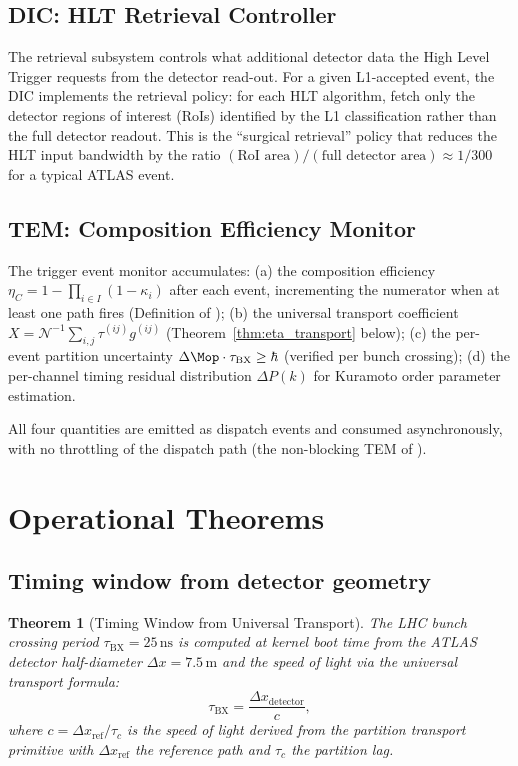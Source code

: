 \documentclass[twocolumn,10pt,a4paper]{article}
\theoremstyle{thmstyle}
\newtheorem{theorem}{Theorem}[section]
\theoremstyle{definition}
\theoremstyle{remark}
\newcommand{\tBX}{\tau_{\mathrm{BX}}}
\newcommand{\DeltaP}{\Delta P}
\newcommand{\etaC}{\eta_{C}}
\newcommand{\TP}{X}
\newcommand{\lag}{\tau}
\newcommand{\cpl}{g}
\newcommand{\catpow}{\kappa}
\begin{document}
\subsection{DIC: HLT Retrieval Controller}

The retrieval subsystem controls what additional detector data the High Level
Trigger requests from the detector read-out. For a given L1-accepted event,
the DIC implements the retrieval policy:
for each HLT algorithm, fetch only the detector regions of interest (RoIs)
identified by the L1 classification rather than the full detector readout.
This is the ``surgical retrieval'' policy that reduces the HLT input bandwidth
by the ratio $(\text{RoI area})/(\text{full detector area}) \approx 1/300$
for a typical ATLAS event.

\subsection{TEM: Composition Efficiency Monitor}

The trigger event monitor accumulates:
(a) the composition efficiency
$\etaC = 1 - \prod_{i \in I}(1-\catpow_i)$
after each event, incrementing the numerator when at least one path fires
(Definition of \citealt{companion:cascade});
(b) the universal transport coefficient
$\TP = \mathcal{N}^{-1}\sum_{i,j}\lag^{(ij)}\cpl^{(ij)}$
(Theorem~\ref{thm:eta_transport} below);
(c) the per-event partition uncertainty
$\Delta\Mop \cdot \tBX \geq \hbar$ (verified per bunch crossing);
(d) the per-channel timing residual distribution $\DeltaP(k)$
for Kuramoto order parameter estimation.

All four quantities are emitted as dispatch events and consumed
asynchronously, with no throttling of the dispatch path
(the non-blocking TEM of \citealt{companion:kernel}).

\section{Operational Theorems}
\label{sec:operational_theorems}

\subsection{Timing window from detector geometry}

\begin{theorem}[Timing Window from Universal Transport]
\label{thm:tbx_runtime}
The LHC bunch crossing period $\tBX = 25\,\mathrm{ns}$ is computed at
kernel boot time from the ATLAS detector half-diameter $\Delta x = 7.5\,\mathrm{m}$
and the speed of light via the universal transport formula:
\begin{equation}
\tBX = \frac{\Delta x_{\mathrm{detector}}}{c},
\label{eq:tbx_transport}
\end{equation}
where $c = \Delta x_{\mathrm{ref}}/\tau_c$ is the speed of light derived from
the partition transport primitive \citep{companion:spectrometer} with
$\Delta x_{\mathrm{ref}}$ the reference path and $\tau_c$ the partition lag.
\end{theorem}
\end{document}
